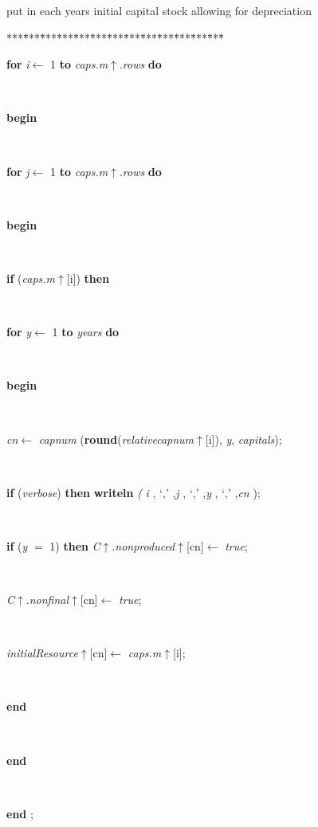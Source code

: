 \documentclass[10pt, a4paper]{article}
\begin{document}
put in each years initial capital stock allowing for depreciation
\begin{tabbing}
***\=***\=***\=***\=***\=***\=***\=***\=***\=***\=***\=***\=***\=\kill
\+ \\
\+\parbox{14cm}{\textsf {\textbf {for } \textsf{\textit{i}$\leftarrow$ 1} \textbf{ to } \textsf{\textit{caps.m}$\uparrow$.\textit{rows}} \textbf{ do } }}\\
\<\parbox{14cm}{\textsf{\textbf{begin} }}\\
\+\parbox{14cm}{\textsf {\textbf {for } \textsf{\textit{j}$\leftarrow$ 1} \textbf{ to } \textsf{\textit{caps.m}$\uparrow$.\textit{rows}} \textbf{ do } }}\\
\<\parbox{14cm}{\textsf{\textbf{begin} }}\\
\+\parbox{14cm}{\textsf {\textbf {if } \textsf{(\textit{caps.m}$\uparrow$\textit{}[i])} \textbf{ then } }}\\
\+\parbox{14cm}{\textsf {\textbf {for } \textsf{\textit{y}$\leftarrow$ 1} \textbf{ to } \textsf{\textit{years}} \textbf{ do } }}\\
\<\parbox{14cm}{\textsf{\textbf{begin} }}\\
\parbox{14cm}{\textsf{\textit{cn}$\leftarrow$ \textit{capnum} (\textbf{round}(\textit{relativecapnum}$\uparrow$\textit{}[i]), \textit{y}, \textit{capitals})}; }\\
\parbox{14cm}{\textsf {\textbf {if } \textsf{(\textit{verbose})} \textbf{ then } \textsf{ \textbf{writeln} \textit{(} \textit{i} ,\textrm{\textup { `,' } },\textit{j} ,\textrm{\textup { `,' } },\textit{y} ,\textrm{\textup { `,' } },\textit{cn} );}}}\\
\parbox{14cm}{\textsf {\textbf {if } \textsf{(\textit{y} $=$ 1)} \textbf{ then } \textsf{\textit{C}$\uparrow$.\textit{nonproduced}$\uparrow$\textit{}[cn]$\leftarrow$ \textit{true}}; }}\\
\parbox{14cm}{\textsf{\textit{C}$\uparrow$.\textit{nonfinal}$\uparrow$\textit{}[cn]$\leftarrow$ \textit{true}}; }\\
\parbox{14cm}{\textsf{\textit{initialResource}$\uparrow$\textit{}[cn]$\leftarrow$ \textit{caps.m}$\uparrow$\textit{}[i]}; }\\
\<\-\parbox{14cm}{\textsf{\textbf{end} }}\\
\<\-\<\-\parbox{14cm}{\textsf{\textbf{end} }}\\
\<\-\parbox{14cm}{\textsf{\textbf{end} ;}}\\
\\
\\
\end{tabbing}
\end{document}
